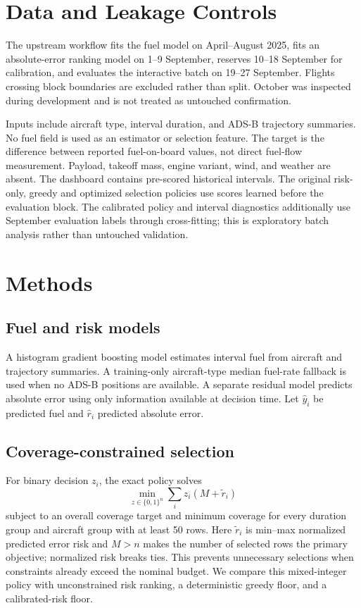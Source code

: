 \documentclass[11pt]{article}
\begin{document}
\section{Data and Leakage Controls}
The upstream workflow fits the fuel model on April--August 2025, fits an absolute-error ranking model on 1--9 September, reserves 10--18 September for calibration, and evaluates the interactive batch on 19--27 September. Flights crossing block boundaries are excluded rather than split. October was inspected during development and is not treated as untouched confirmation.

Inputs include aircraft type, interval duration, and ADS-B trajectory summaries. No fuel field is used as an estimator or selection feature. The target is the difference between reported fuel-on-board values, not direct fuel-flow measurement. Payload, takeoff mass, engine variant, wind, and weather are absent. The dashboard contains pre-scored historical intervals. The original risk-only, greedy and optimized selection policies use scores learned before the evaluation block. The calibrated policy and interval diagnostics additionally use September evaluation labels through cross-fitting; this is exploratory batch analysis rather than untouched validation.

\section{Methods}
\subsection{Fuel and risk models}
A histogram gradient boosting model estimates interval fuel from aircraft and trajectory summaries. A training-only aircraft-type median fuel-rate fallback is used when no ADS-B positions are available. A separate residual model predicts absolute error using only information available at decision time. Let $\hat y_i$ be predicted fuel and $\hat r_i$ predicted absolute error.

\subsection{Coverage-constrained selection}
For binary decision $z_i$, the exact policy solves
\[
  \min_{z\in\{0,1\}^n}\sum_i z_i(M+\tilde r_i)
\]
subject to an overall coverage target and minimum coverage for every duration group and aircraft group with at least 50 rows. Here $\tilde r_i$ is min--max normalized predicted error risk and $M>n$ makes the number of selected rows the primary objective; normalized risk breaks ties. This prevents unnecessary selections when constraints already exceed the nominal budget. We compare this mixed-integer policy with unconstrained risk ranking, a deterministic greedy floor, and a calibrated-risk floor.
\end{document}
